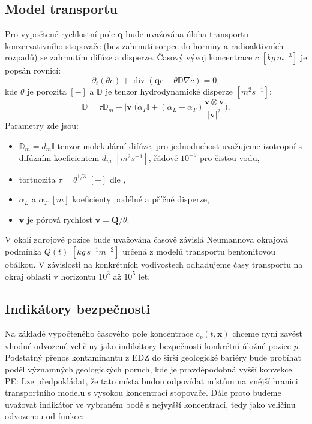 \documentclass{article}
\def\abs#1{\lvert#1\rvert}
\def\prtl{\partial}
\def\grad{\nabla}
\def\div{\operatorname{div}}
\def\vc#1{\mathbf{\boldsymbol{#1}}}     %
\def\tn#1{{\mathbb{#1}}}    %
\newcommand{\pe}[1]{{\color{orange} PE: #1}}
\begin{document}
\subsection{Model transportu}
\label{sec:stopovac}
Pro vypočtené rychlostní pole $\vc q$ bude uvažována úloha transportu konzervativního stopovače (bez zahrnutí sorpce do horniny a radioaktivních rozpadů) 
se zahrnutím difúze a disperze. Časový vývoj koncentrace $c$ $[kg\, m^{-3}]$ je popsán rovnicí:
\[
   \prtl_t (\theta c) + \div( \vc q c - \theta \tn D \grad c) = 0,
\]
kde $\theta$ je porozita $[-]$ a $\tn D$ je tenzor hydrodynamické disperze $[m^2s^{-1}]$:
\[
  \tn D = \tau\tn D_m + \abs{\vc v}\Big(\alpha_T \tn I + (\alpha_L - \alpha_T)\frac{\vc v \otimes \vc v}{\abs{\vc v}^2}\Big).
\]
Parametry zde jsou:
\begin{itemize}
 \item $\tn D_m = d_m \tn I$ tenzor molekulární difúze, pro jednoduchost uvažujeme izotropní s difúzním koeficientem $d_m$ $[m^2s^{-1}]$, řádově $10^{-9}$ pro čistou vodu,
 \item tortuozita $\tau=\theta^{1/3}$ $[-]$ dle \cite{millington_quirk},
 \item $\alpha_L$ a $\alpha_T$ $[m]$ koeficienty podélné a příčné disperze,
 \item $\vc v$ je pórová rychlost $\vc v = \vc Q / \theta$.
\end{itemize}

V okolí zdrojové pozice bude uvažována časově závislá Neumannova okrajová podmínka $Q(t)$ $[kg\, s^{-1}m^{-2}]$
určená z modelů transportu bentonitovou obálkou. V závislosti na konkrétních vodivostech odhadujeme časy 
transportu na okraj oblasti v horizontu $10^3$ až $10^5$ let. 



\subsection{Indikátory bezpečnosti}
\label{sec:indikatory}
Na základě vypočteného časového pole koncentrace $c_p(t, \vc x)$ chceme nyní zavést vhodné odvozené veličiny jako indikátory bezpečnosti 
konkrétní úložné pozice $p$. Podstatný přenos kontaminantu z EDZ do širší geologické bariéry bude probíhat podél významných geologických poruch, 
kde je pravděpodobná vyšší konvekce. 
\pe{Lze předpokládat, že tato místa budou odpovídat místům na vnější hranici transportního modelu s vysokou koncentrací stopovače. 
Dále proto budeme uvažovat indikátor ve vybraném bodě s nejvyšší koncentrací, tedy jako veličinu odvozenou od funkce:}
\end{document}
